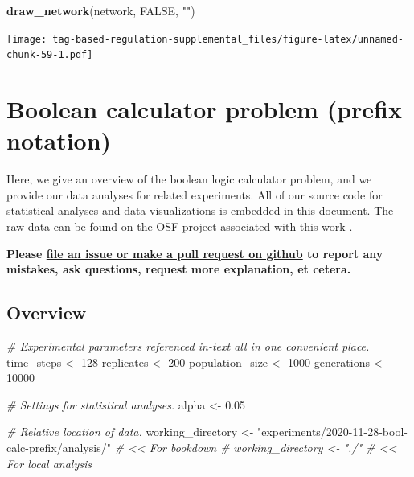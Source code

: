 \documentclass[
]{book}
\newenvironment{Shaded}{\begin{snugshade}}{\end{snugshade}}
\newcommand{\CommentTok}[1]{\textcolor[rgb]{0.56,0.35,0.01}{\textit{#1}}}
\newcommand{\DecValTok}[1]{\textcolor[rgb]{0.00,0.00,0.81}{#1}}
\newcommand{\FloatTok}[1]{\textcolor[rgb]{0.00,0.00,0.81}{#1}}
\newcommand{\KeywordTok}[1]{\textcolor[rgb]{0.13,0.29,0.53}{\textbf{#1}}}
\newcommand{\NormalTok}[1]{#1}
\newcommand{\OtherTok}[1]{\textcolor[rgb]{0.56,0.35,0.01}{#1}}
\newcommand{\StringTok}[1]{\textcolor[rgb]{0.31,0.60,0.02}{#1}}
\begin{document}
\begin{Shaded}
\begin{Highlighting}[]
\KeywordTok{draw\_network}\NormalTok{(network, }\OtherTok{FALSE}\NormalTok{, }\StringTok{""}\NormalTok{)}
\end{Highlighting}
\end{Shaded}

\texttt{[image: tag-based-regulation-supplemental\_files/figure-latex/unnamed-chunk-59-1.pdf]}

\hypertarget{boolean-calculator-problem-prefix-notation}{%
\chapter{Boolean calculator problem (prefix notation)}\label{boolean-calculator-problem-prefix-notation}}

Here, we give an overview of the boolean logic calculator problem, and we provide our data analyses for related experiments.
All of our source code for statistical analyses and data visualizations is embedded in this document.
The raw data can be found on the OSF project associated with this work \citep{Lalejini_Moreno_Ofria_Data_2020}.

\textbf{Please \href{https://github.com/amlalejini/Tag-based-Genetic-Regulation-for-LinearGP/issues}{file an issue or make a pull request on github} to report any mistakes, ask questions, request more explanation, et cetera.}

\hypertarget{overview-2}{%
\section{Overview}\label{overview-2}}

\begin{Shaded}
\begin{Highlighting}[]
\CommentTok{\# Experimental parameters referenced in{-}text all in one convenient place.}
\NormalTok{time\_steps \textless{}{-}}\StringTok{ }\DecValTok{128}
\NormalTok{replicates \textless{}{-}}\StringTok{ }\DecValTok{200}
\NormalTok{population\_size \textless{}{-}}\StringTok{ }\DecValTok{1000}
\NormalTok{generations \textless{}{-}}\StringTok{ }\DecValTok{10000}

\CommentTok{\# Settings for statistical analyses.}
\NormalTok{alpha \textless{}{-}}\StringTok{ }\FloatTok{0.05}

\CommentTok{\# Relative location of data.}
\NormalTok{working\_directory \textless{}{-}}\StringTok{ "experiments/2020{-}11{-}28{-}bool{-}calc{-}prefix/analysis/"} \CommentTok{\# \textless{}\textless{} For bookdown}
\CommentTok{\# working\_directory \textless{}{-} "./"                                              \# \textless{}\textless{} For local analysis}
\end{Highlighting}
\end{Shaded}
\end{document}
